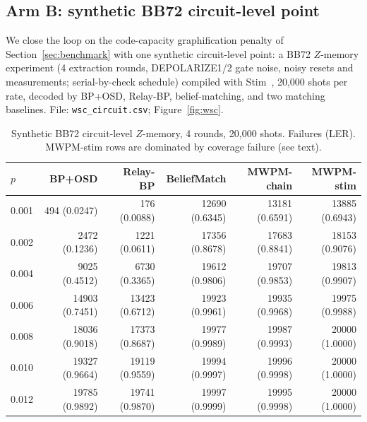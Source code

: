 \documentclass[11pt,a4paper]{article}
\begin{document}
\subsection{Arm B: synthetic BB72 circuit-level point}

We close the loop on the code-capacity graphification penalty of
Section~\ref{sec:benchmark} with one synthetic circuit-level point: a BB72
$Z$-memory experiment (4 extraction rounds, DEPOLARIZE1/2 gate noise,
noisy resets and measurements; serial-by-check schedule) compiled with
Stim~\cite{Gidney2021}, 20{,}000 shots per rate, decoded by BP+OSD, Relay-BP,
belief-matching, and two matching baselines. File: \texttt{wsc\_circuit.csv};
Figure~\ref{fig:wsc}.

\begin{table}[H]\centering\small
\caption{Synthetic BB72 circuit-level $Z$-memory, 4 rounds, 20{,}000 shots.
  Failures (LER). MWPM-stim rows are dominated by coverage failure (see text).}
\label{tab:wsc}
\begin{tabular}{@{}lrrrrr@{}}
\toprule
$p$ & BP+OSD & Relay-BP & BeliefMatch & MWPM-chain & MWPM-stim \\
\midrule
0.001 & 494 (0.0247) & 176 (0.0088) & 12690 (0.6345) & 13181 (0.6591) & 13885 (0.6943) \\
0.002 & 2472 (0.1236) & 1221 (0.0611) & 17356 (0.8678) & 17683 (0.8841) & 18153 (0.9076) \\
0.004 & 9025 (0.4512) & 6730 (0.3365) & 19612 (0.9806) & 19707 (0.9853) & 19813 (0.9907) \\
0.006 & 14903 (0.7451) & 13423 (0.6712) & 19923 (0.9961) & 19935 (0.9968) & 19975 (0.9988) \\
0.008 & 18036 (0.9018) & 17373 (0.8687) & 19977 (0.9989) & 19987 (0.9993) & 20000 (1.0000) \\
0.010 & 19327 (0.9664) & 19119 (0.9559) & 19994 (0.9997) & 19996 (0.9998) & 20000 (1.0000) \\
0.012 & 19785 (0.9892) & 19741 (0.9870) & 19997 (0.9999) & 19995 (0.9998) & 20000 (1.0000) \\
\bottomrule
\end{tabular}
\end{table}
\end{document}
